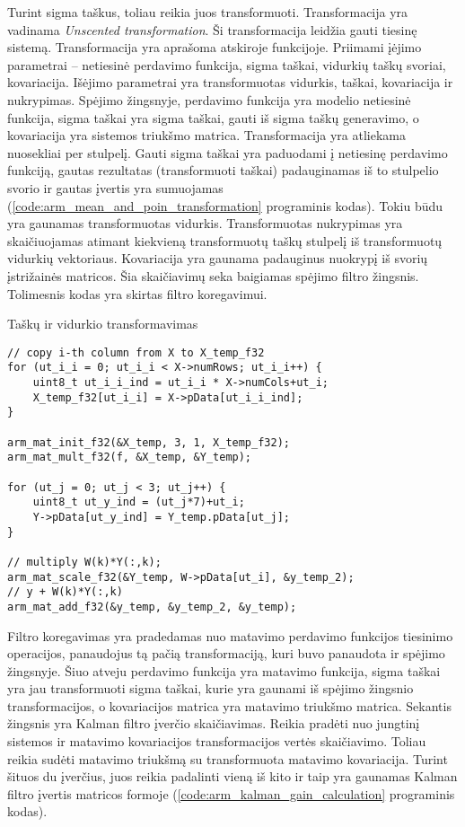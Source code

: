 Turint sigma taškus, toliau reikia juos transformuoti.
Transformacija \cite{julier2002scaled} yra vadinama \textit{Unscented transformation}.
Ši transformacija leidžia gauti tiesinę sistemą.
Transformacija yra aprašoma atskiroje funkcijoje.
Priimami įėjimo parametrai -- netiesinė perdavimo funkcija, sigma taškai, vidurkių taškų svoriai, kovariacija.
Išėjimo parametrai yra transformuotas vidurkis, taškai, kovariacija ir nukrypimas.
Spėjimo žingsnyje, perdavimo funkcija yra modelio netiesinė funkcija, sigma taškai yra sigma taškai, gauti iš sigma taškų generavimo, o kovariacija yra sistemos triukšmo matrica.
Transformacija yra atliekama nuosekliai per stulpelį.
Gauti sigma taškai yra paduodami į netiesinę perdavimo funkciją, gautas rezultatas (transformuoti taškai) padauginamas iš to stulpelio svorio ir gautas įvertis yra sumuojamas (\ref{code:arm_mean_and_poin_transformation} programinis kodas).
Tokiu būdu yra gaunamas transformuotas vidurkis.
Transformuotas nukrypimas yra skaičiuojamas atimant kiekvieną transformuotų taškų stulpelį iš transformuotų vidurkių vektoriaus.
Kovariacija yra gaunama padauginus nuokrypį iš svorių įstrižainės matricos. Šia skaičiavimų seka baigiamas spėjimo filtro žingsnis.
Tolimesnis kodas yra skirtas filtro koregavimui.

\begin{cfigure}
    \centering
    \caption{Taškų ir vidurkio transformavimas}
    \label{code:arm_mean_and_poin_transformation}
    \begin{lstlisting}
// copy i-th column from X to X_temp_f32
for (ut_i_i = 0; ut_i_i < X->numRows; ut_i_i++) {
    uint8_t ut_i_i_ind = ut_i_i * X->numCols+ut_i;
    X_temp_f32[ut_i_i] = X->pData[ut_i_i_ind];
}

arm_mat_init_f32(&X_temp, 3, 1, X_temp_f32);
arm_mat_mult_f32(f, &X_temp, &Y_temp);

for (ut_j = 0; ut_j < 3; ut_j++) {
    uint8_t ut_y_ind = (ut_j*7)+ut_i;
    Y->pData[ut_y_ind] = Y_temp.pData[ut_j];
}

// multiply W(k)*Y(:,k);
arm_mat_scale_f32(&Y_temp, W->pData[ut_i], &y_temp_2);
// y + W(k)*Y(:,k)
arm_mat_add_f32(&y_temp, &y_temp_2, &y_temp);
    \end{lstlisting}
\end{cfigure}

Filtro koregavimas yra pradedamas nuo matavimo perdavimo funkcijos tiesinimo operacijos, panaudojus tą pačią transformaciją, kuri buvo panaudota ir spėjimo žingsnyje.
Šiuo atveju perdavimo funkcija yra matavimo funkcija, sigma taškai yra jau transformuoti sigma taškai, kurie yra gaunami iš spėjimo žingsnio transformacijos, o kovariacijos matrica yra matavimo triukšmo matrica.
Sekantis žingsnis yra Kalman filtro įverčio skaičiavimas.
Reikia pradėti nuo jungtinį sistemos ir matavimo kovariacijos transformacijos vertės skaičiavimo.
Toliau reikia sudėti matavimo triukšmą su transformuota matavimo kovariacija.
Turint šituos du įverčius, juos reikia padalinti vieną iš kito ir taip yra gaunamas Kalman filtro įvertis matricos formoje (\ref{code:arm_kalman_gain_calculation} programinis kodas).

